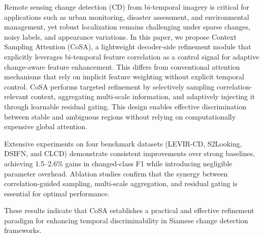 Remote sensing change detection (CD) from bi-temporal imagery is critical for applications such as urban monitoring, disaster assessment, and environmental management, yet robust localization remains challenging under sparse changes, noisy labels, and appearance variations.
In this paper, we propose Context Sampling Attention (CoSA), a lightweight decoder-side refinement module that explicitly leverages bi-temporal feature correlation as a control signal for adaptive change-aware feature enhancement. This differs from conventional attention mechanisms that rely on implicit feature weighting without explicit temporal control. CoSA performs targeted refinement by selectively sampling correlation-relevant context, aggregating multi-scale information, and adaptively injecting it through learnable residual gating. This design enables effective discrimination between stable and ambiguous regions without relying on computationally expensive global attention.

Extensive experiments on four benchmark datasets (LEVIR-CD, S2Looking, DSIFN, and CLCD) demonstrate consistent improvements over strong baselines, achieving 1.5--2.6\% gains in changed-class F1 while introducing negligible parameter overhead. Ablation studies confirm that the synergy between correlation-guided sampling, multi-scale aggregation, and residual gating is essential for optimal performance.

These results indicate that CoSA establishes a practical and effective refinement paradigm for enhancing temporal discriminability in Siamese change detection frameworks.
